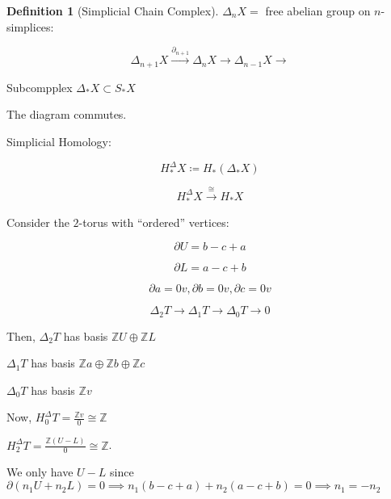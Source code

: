 \documentclass{article}
\theoremstyle{definition}
\newtheorem*{definition}{Definition}
\begin{document}
    \begin{definition}
        [Simplicial Chain Complex] \(\Delta_n X =\) free abelian group on \(n\)-simplices:

        \[
            \Delta_{n+1} X \xrightarrow{\partial_{n+1}} \Delta_n X \to \Delta_{n-1} X \to 
        \]

        Subcompplex \(\Delta_{\ast} X \subset S_{\ast} X\) 

        \begin{center}
        \end{center}

        The diagram commutes.

        Simplicial Homology:

        \[
            H_{\ast} ^\Delta X \coloneqq H_{\ast} (\Delta_{\ast} X)
        \]

        \[
            H_{\ast}^\Delta X \xrightarrow{\cong} H_{\ast} X
        \]
        
    \end{definition}

    Consider the \(2\)-torus with ``ordered'' vertices:



    \[
        \partial U = b-c+a
    \]

    \[
        \partial L = a-c+b
    \]

    \[
        \partial a = 0v, \partial b = 0v, \partial c = 0v
    \]

    \[
        \Delta_2 T \to \Delta_1 T \to \Delta_0 T \to 0
    \]

    Then, \(\Delta_2 T\) has basis \(\mathbb{Z} U \oplus \mathbb{Z} L\)

    \(\Delta_1 T\) has basis \(\mathbb{Z} a \oplus \mathbb{Z} b \oplus \mathbb{Z} c\)
    
    \(\Delta_0 T\) has basis \(\mathbb{Z}v\)

    Now, \(H_0^\Delta T = \frac{\mathbb{Z} v}{0} \cong \mathbb{Z}\) 

    \(H_2^\Delta T = \frac{\mathbb{Z}(U-L)}{0}\cong \mathbb{Z}\).

    We only have \(U-L\) since \(\partial(n_1 U + n_2 L) = 0 \implies n_1(b-c+a) + n_2(a-c+b) = 0 \implies n_1 = -n_2\)
\end{document}

